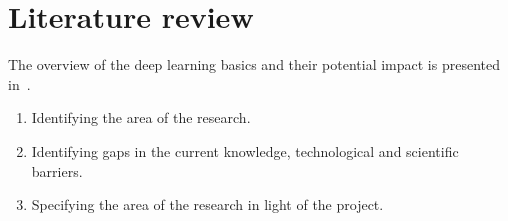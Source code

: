 \chapter{Literature review}

The overview of the deep learning basics and their potential impact is presented in~\cite{lecun2015deep}.
\begin{enumerate}
    \item Identifying the area of the research.
    
    \item Identifying gaps in the current knowledge, technological and scientific barriers.
    
    \item Specifying the area of the research in light of the project.
\end{enumerate}